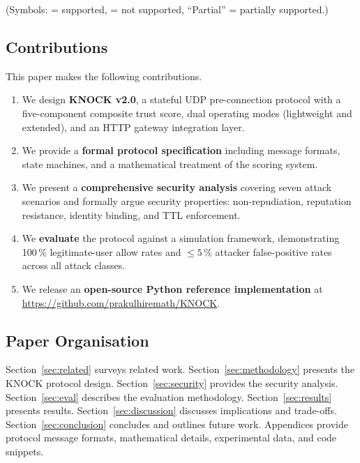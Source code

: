 \documentclass[10pt,conference]{IEEEtran}
\begin{document}
\noindent
(Symbols:  = supported,  = not supported,
``Partial'' = partially supported.)

\subsection{Contributions}

This paper makes the following contributions.

\begin{enumerate}[leftmargin=*]
  \item We design \textbf{KNOCK v2.0}, a stateful UDP pre-connection
    protocol with a five-component composite trust score, dual
    operating modes (lightweight and extended), and an HTTP gateway
    integration layer.

  \item We provide a \textbf{formal protocol specification} including
    message formats, state machines, and a mathematical treatment of
    the scoring system.

  \item We present a \textbf{comprehensive security analysis} covering
    seven attack scenarios and formally argue security properties:
    non-repudiation, reputation resistance, identity binding, and TTL
    enforcement.

  \item We \textbf{evaluate} the protocol against a simulation
    framework, demonstrating 100\,\% legitimate-user allow rates and
    $\leq\!5\,\%$ attacker false-positive rates across all attack
    classes.

  \item We release an \textbf{open-source Python reference
    implementation} at
    \url{https://github.com/prakulhiremath/KNOCK}.
\end{enumerate}

\subsection{Paper Organisation}

Section~\ref{sec:related} surveys related work.
Section~\ref{sec:methodology} presents the KNOCK protocol design.
Section~\ref{sec:security} provides the security analysis.
Section~\ref{sec:eval} describes the evaluation methodology.
Section~\ref{sec:results} presents results.
Section~\ref{sec:discussion} discusses implications and trade-offs.
Section~\ref{sec:conclusion} concludes and outlines future work.
Appendices provide protocol message formats, mathematical details,
experimental data, and code snippets.
\end{document}
